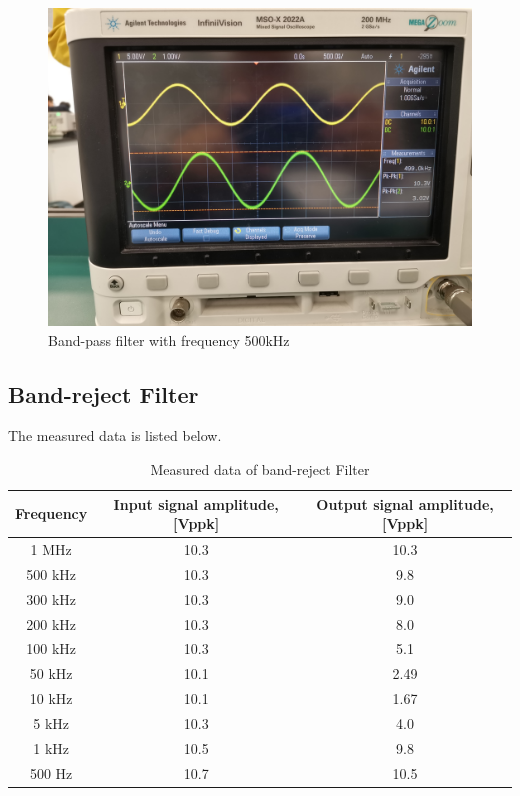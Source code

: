 \documentclass{article}
\begin{document}
  \begin{figure}[H]
  \centering
  \includegraphics[width=.6\textwidth]{Figure12.jpg}
  \caption{Band-pass filter with frequency 500kHz}
  \label{img} 
\end{figure}

\subsection{Band-reject Filter}
The measured data is listed below.
\begin{table}[H]
\centering
\begin{tabular}{|c|c|c|}
\hline
Frequency & Input signal amplitude, {[}Vppk{]} & Output signal amplitude, {[}Vppk{]} \\ \hline
1 MHz     & 10.3                               & 10.3                                \\ \hline
500 kHz   & 10.3                               & 9.8                                 \\ \hline
300 kHz   & 10.3                               & 9.0                                 \\ \hline
200 kHz   & 10.3                               & 8.0                                 \\ \hline
100 kHz   & 10.3                               & 5.1                                 \\ \hline
50 kHz    & 10.1                               & 2.49                                \\ \hline
10 kHz    & 10.1                               & 1.67                                \\ \hline
5 kHz     & 10.3                               & 4.0                                 \\ \hline
1 kHz     & 10.5                               & 9.8                                 \\ \hline
500 Hz    & 10.7                               & 10.5                                \\ \hline
\end{tabular}
\caption{Measured data of band-reject Filter}
\end{table}
\end{document}
